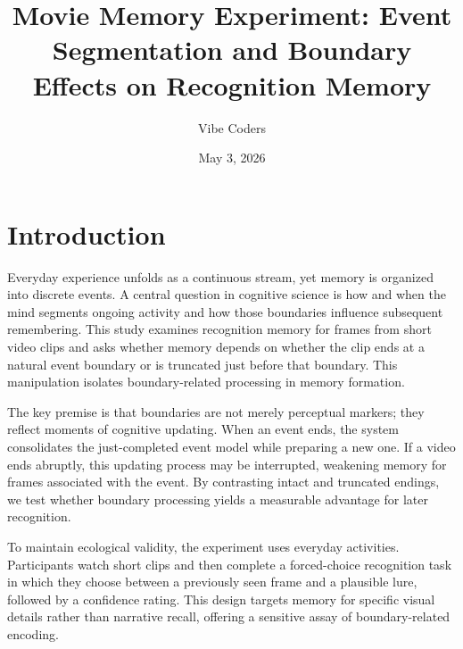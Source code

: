 \documentclass[11pt]{article}
\title{Movie Memory Experiment: Event Segmentation and Boundary Effects on Recognition Memory}
\author{Vibe Coders}
\date{May 3, 2026}
\begin{document}

\section{Introduction}
Everyday experience unfolds as a continuous stream, yet memory is organized into discrete events. A central question in cognitive science is how and when the mind segments ongoing activity and how those boundaries influence subsequent remembering. This study examines recognition memory for frames from short video clips and asks whether memory depends on whether the clip ends at a natural event boundary or is truncated just before that boundary. This manipulation isolates boundary-related processing in memory formation.

The key premise is that boundaries are not merely perceptual markers; they reflect moments of cognitive updating. When an event ends, the system consolidates the just-completed event model while preparing a new one. If a video ends abruptly, this updating process may be interrupted, weakening memory for frames associated with the event. By contrasting intact and truncated endings, we test whether boundary processing yields a measurable advantage for later recognition.

To maintain ecological validity, the experiment uses everyday activities. Participants watch short clips and then complete a forced-choice recognition task in which they choose between a previously seen frame and a plausible lure, followed by a confidence rating. This design targets memory for specific visual details rather than narrative recall, offering a sensitive assay of boundary-related encoding.
\end{document}
